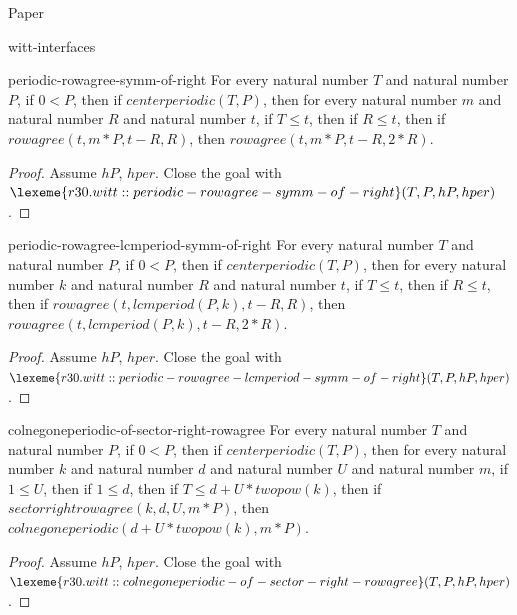 \begin{lexlean}{Paper}
\begin{section}{witt-interfaces}
  \begin{theorem}{periodic-rowagree-symm-of-right}
  For every natural number \(T\) and natural number \(P\), if \(0 < P\), then if \(centerperiodic(T, P)\), then for every natural number \(m\) and natural number \(R\) and natural number \(t\), if \(T ≤ t\), then if \(R ≤ t\), then if \(rowagree(t, m * P, t - R, R)\), then \(rowagree(t, m * P, t - R, 2 * R)\).
  \begin{proof}
  Assume \(hP\), \(hper\).
  Close the goal with \(\lexeme{r30.witt::periodic-rowagree-symm-of-right}(T, P, hP, hper)\).
  \end{proof}
  \end{theorem}

  \begin{theorem}{periodic-rowagree-lcmperiod-symm-of-right}
  For every natural number \(T\) and natural number \(P\), if \(0 < P\), then if \(centerperiodic(T, P)\), then for every natural number \(k\) and natural number \(R\) and natural number \(t\), if \(T ≤ t\), then if \(R ≤ t\), then if \(rowagree(t, lcmperiod(P, k), t - R, R)\), then \(rowagree(t, lcmperiod(P, k), t - R, 2 * R)\).
  \begin{proof}
  Assume \(hP\), \(hper\).
  Close the goal with \(\lexeme{r30.witt::periodic-rowagree-lcmperiod-symm-of-right}(T, P, hP, hper)\).
  \end{proof}
  \end{theorem}

  \begin{theorem}{colnegoneperiodic-of-sector-right-rowagree}
  For every natural number \(T\) and natural number \(P\), if \(0 < P\), then if \(centerperiodic(T, P)\), then for every natural number \(k\) and natural number \(d\) and natural number \(U\) and natural number \(m\), if \(1 ≤ U\), then if \(1 ≤ d\), then if \(T ≤ d + U * twopow(k)\), then if \(sectorrightrowagree(k, d, U, m * P)\), then \(colnegoneperiodic(d + U * twopow(k), m * P)\).
  \begin{proof}
  Assume \(hP\), \(hper\).
  Close the goal with \(\lexeme{r30.witt::colnegoneperiodic-of-sector-right-rowagree}(T, P, hP, hper)\).
  \end{proof}
  \end{theorem}


\end{section}
\end{lexlean}
